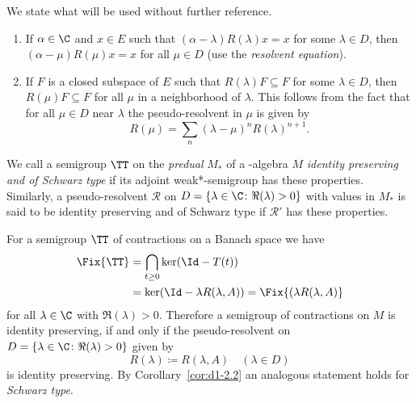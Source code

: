 We state what will be used without further reference.
\begin{enumerate}[\upshape(i), wide, labelindent=.25em]
\item 
If\/ $ \alpha \in \C $ and $ x \in E $ such that $ (\alpha - \lambda)R(\lambda)x = x $ for some $ \lambda \in D $, then $ (\alpha - \mu)R(\mu)x = x $ for all $ \mu \in D $ (use the \emph{resolvent equation}).

\item 
If\/ $ F $ is a closed subspace of\/ $ E $ such that $ R(\lambda)F \subseteq F $ for some $ \lambda \in D $, then $ R(\mu)F \subseteq F $ for all $ \mu $ in a neighborhood of\/ $ \lambda $.
This follows from the fact that for all $ \mu \in D $ near $ \lambda $ the pseudo-resolvent in $ \mu $ is given by
\[
R(\mu) = \sum_{n} (\lambda - \mu)^{n} R(\lambda)^{n+1}.
\]
\end{enumerate}
\begin{definition}\label{def:d1-2.5}
We call a semigroup $ \TT $ on the \emph{predual} $ M_{*} $ of a \WA-algebra $ M $ \emph{identity preserving and of Schwarz type} if its adjoint weak*-semigroup has these properties.
Similarly, a pseudo-resolvent $ \mathcal{R} $ on $ D = \{\lambda \in \C \colon \Re(\lambda) > 0\} $ with values in $ M_{*} $ is said to be identity preserving and of Schwarz type if\/ $ \mathcal{R}' $ has these properties.
\end{definition}
For a semigroup $ \TT $ of contractions on a Banach space we have
\begin{align*}
	\Fix{\TT} &= \bigcap_{t \geq 0} \ker(\Id  - T(t)) \\ 
			& = \ker(\Id - \lambda R(\lambda,A)) = \Fix{ (\lambda R(\lambda,A) }
\end{align*}
for all $ \lambda \in \C $ with $ \Re(\lambda) > 0 $.
Therefore a semigroup of contractions on $ M $ is identity preserving, if and only if the pseudo-resolvent on 
$ D = \{\lambda \in \C \colon \Re(\lambda) > 0\} $ given by
\[
	R(\lambda) \coloneqq R(\lambda,A) \quad (\lambda \in D)
\]
is identity preserving.
By Corollary~\ref{cor:d1-2.2} an analogous statement holds for \emph{Schwarz type}.
